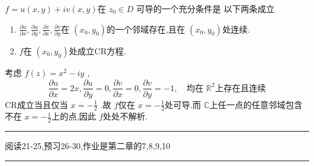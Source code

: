 \documentclass[../../复变函数.tex]{subfiles}
\begin{document}
\begin{corollary}
    \(  f= u\left( x,y \right)+ iv\left( x,y \right)    \)在 \(  z_0 \in D  \) 可导的一个充分条件是 以下两条成立
    \begin{enumerate}
        \item \(  \frac{\partial u}{\partial x},\frac{\partial u}{\partial y},\frac{\partial v}{\partial x},\frac{\partial v}{\partial y}  \)在 \(  \left( x_0,y_0 \right)   \)的一个邻域存在,且在 \(  \left( x_0,y_0 \right)   \)处连续.
        \item \(  f  \)在 \(  \left( x_0,y_0 \right)   \)处成立CR方程.     
    \end{enumerate}
    
\end{corollary}

\begin{example}
    考虑 \(  f\left( z \right)=  x^{2}-iy   \) , \[
    \frac{\partial u}{\partial x}= 2x,\frac{\partial u}{\partial y}= 0,\frac{\partial v}{\partial x}= 0,\frac{\partial v}{\partial y}= -1,\quad \text{均在 }\mathbb{R} ^{2}\text{上存在且连续}
    \]CR成立当且仅当 \(  x= - \frac{1}{2}  \) .故 \(  f  \)仅在 \(  x = -\frac{1}{2}  \)处可导.而 \(  \mathbb{C}   \)上任一点的任意邻域包含不在 \(  x= -\frac{1}{2}  \)上的点,因此 \(  f  \)处处不解析.     
\end{example}

\hspace*{\fill}


\hspace*{\fill} 
\hrule
\hspace*{\fill}

阅读21-25,预习26-30,作业是第二章的7,8,9,10

\hspace*{\fill} 
\hrule
\hspace*{\fill}
\end{document}
